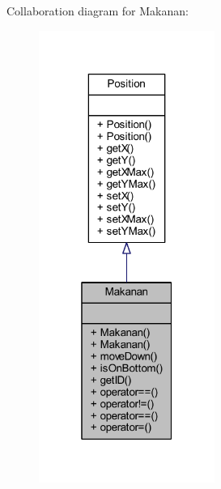 Collaboration diagram for Makanan\+:
\nopagebreak
\begin{figure}[H]
\begin{center}
\leavevmode
\includegraphics[width=163pt]{class_makanan__coll__graph}
\end{center}
\end{figure}
